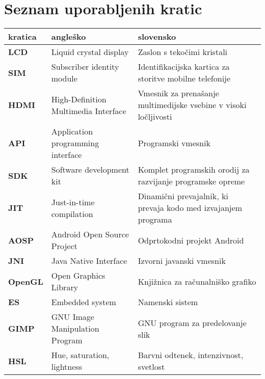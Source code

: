 \chapter*{Seznam uporabljenih kratic}

\begin{tabular}{l|p{5cm}|p{6cm}}
    {\bf kratica} & {\bf angleško} & {\bf slovensko} \\ \hline
    {\bf LCD} & Liquid crystal display & Zaslon s tekočimi kristali \\
    {\bf SIM} & Subscriber identity module & Identifikacijska kartica za storitve mobilne telefonije \\
    {\bf HDMI} & High-Definition Multimedia Interface & Vmesnik za prenašanje multimedijske vsebine v visoki ločljivosti \\
    {\bf API} & Application programming interface & Programski vmesnik \\
    {\bf SDK} & Software development kit & Komplet programskih orodij za razvijanje programske opreme \\
    {\bf JIT} & Just-in-time compilation & Dinamični prevajalnik, ki prevaja kodo med izvajanjem programa \\
    {\bf AOSP} & Android Open Source Project & Odprtokodni projekt Android \\
    {\bf JNI} & Java Native Interface & Izvorni javanski vmesnik \\
    {\bf OpenGL} & Open Graphics Library & Knjižnica za računalniško grafiko \\
    {\bf ES} & Embedded system & Namenski sistem \\
    {\bf GIMP} & GNU Image Manipulation Program & GNU program za predelovanje slik \\
    {\bf HSL} & Hue, saturation, lightness & Barvni odtenek, intenzivnost, svetlost
\end{tabular}
